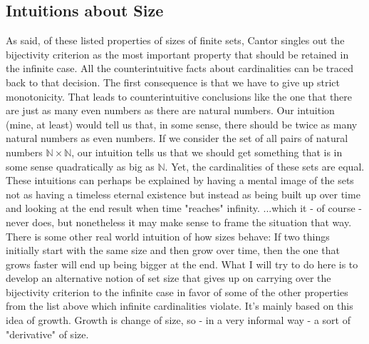 \documentclass[12pt]{article}
\begin{document}


\subsection{Intuitions about Size}
As said, of these listed properties of sizes of finite sets, Cantor singles out the bijectivity criterion as the most important property that should be retained in the infinite case. All the counterintuitive facts about cardinalities can be traced back to that decision. The first consequence is that we have to give up strict monotonicity. That leads to counterintuitive conclusions like the one that there are just as many even numbers as there are natural numbers. Our intuition (mine, at least) would tell us that, in some sense, there should be twice as many natural numbers as even numbers. If we consider the set of all pairs of natural numbers $\mathbb{N} \times \mathbb{N}$, our intuition tells us that we should get something that is in some sense quadratically as big as $\mathbb{N}$. Yet, the cardinalities of these sets are equal. These intuitions can perhaps be explained by having a mental image of the sets not as having a timeless eternal existence but instead as being built up over time and looking at the end result when time "reaches" infinity. ...which it - of course - never does, but nonetheless it may make sense to frame the situation that way. There is some other real world intuition of how sizes behave: If two things initially start with the same size and then grow over time, then the one that grows faster will end up being bigger at the end. What I will try to do here is to develop an alternative notion of set size that gives up on carrying over the bijectivity criterion to the infinite case in favor of some of the other properties from the list above which infinite cardinalities violate. It's mainly based on this idea of growth. Growth is change of size, so - in a very informal way - a sort of "derivative" of size.
\end{document}
